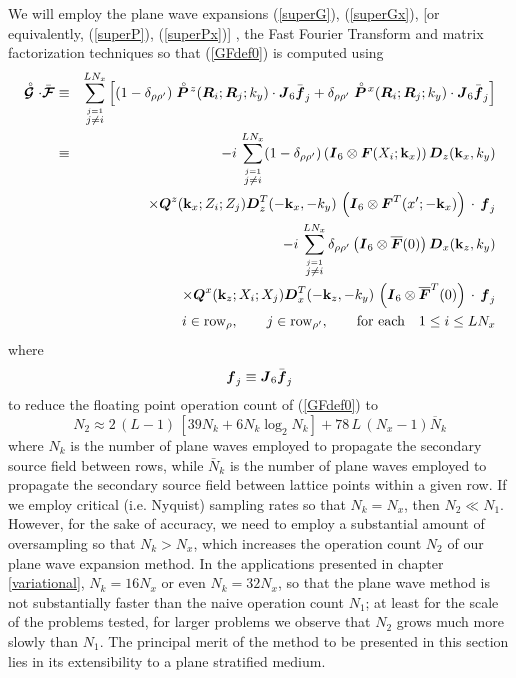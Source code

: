 We will employ the plane wave expansions (\ref{superG}), (\ref{superGx}),
[or equivalently,  (\ref{superP}), (\ref{superPx})] , the  Fast Fourier 
Transform and 
matrix factorization techniques so that (\ref{GFdef0}) is computed using
\begin{eqnarray} \label{GFdef}
\stackrel{\scriptscriptstyle _{\,\,\circ}}{ \mbox{\boldmath$\cal G$\unboldmath}} \cdot \bar{\mbox{\boldmath$\cal F$\unboldmath}} &\equiv& \sum\limits_{ \stackrel{j= 1}{j\not= i}}^{ 
L{N}_{x}} \left[
(1-\delta_{\rho \rho^{\prime}})
\stackrel{\scriptscriptstyle _{\,\,\circ}}{ \mbox{\boldmath$\mit P$\unboldmath}}\!{}^{z}({\mbox{\boldmath$\mit R$\unboldmath}}_{i};{\mbox{\boldmath$\mit R$\unboldmath}}_{j};{k}_{y}) \cdot {\mbox{\boldmath$\mit J$\unboldmath}}_6 \bar{\mbox{\boldmath$\mit f$\unboldmath}}_{ j}
+
\delta_{\rho \rho^{\prime}}\stackrel{\scriptscriptstyle _{\,\,\circ}}{ \mbox{\boldmath$\mit P$\unboldmath}}\!{}^{x}({\mbox{\boldmath$\mit R$\unboldmath}}_{i};{\mbox{\boldmath$\mit R$\unboldmath}}_{j};{k}_{y}) 
 \cdot {\mbox{\boldmath$\mit J$\unboldmath}}_6 \bar{\mbox{\boldmath$\mit f$\unboldmath}}_{ j}\right]\nonumber\\
&\equiv&- i\,\sum\limits_{ \stackrel{j= 1}{j\not= i}}^{ L{N}_{x}}
(1-\delta_{\rho \rho^{\prime}})\left({\mbox{\boldmath$\mit I$\unboldmath}}_6\otimes 
{\mbox{\boldmath$\mit F$\unboldmath}}(X_i;{\bf k}_{x})  \right) {\mbox{\boldmath$\mit D$\unboldmath}}_{z}({\bf k}_{x},{k}_{y})\nonumber\\
&& \times 
{\mbox{\boldmath$\mit Q$\unboldmath}}^{z}({\bf k}_{x};Z_i;Z_j){\mbox{\boldmath$\mit D$\unboldmath}}_{z}^{T}(-{\bf k}_{x},-{k}_{y})
\,\left({\mbox{\boldmath$\mit I$\unboldmath}}_6\otimes {\mbox{\boldmath$\mit F$\unboldmath}}^{T}(x^{\prime};-{\bf k}_{x})  \right)
\,\cdot\,{\mbox{\boldmath$\mit f$\unboldmath}}_{ j}\nonumber\\
&&- i\, \sum\limits_{ \stackrel{j= 1}{j\not= i}}^{ L{N}_{x}}
\delta_{\rho \rho^{\prime}}
\left({\mbox{\boldmath$\mit I$\unboldmath}}_6\otimes \overline{\mbox{\boldmath$\mit F$\unboldmath}}(0)  \right)
 {\mbox{\boldmath$\mit D$\unboldmath}}_{x}({\bf k}_{z},{k}_{y})\nonumber\\
&&\times
 {\mbox{\boldmath$\mit Q$\unboldmath}}^{x}({\bf k}_{z};X_i;X_j){\mbox{\boldmath$\mit D$\unboldmath}}_{x}^{T}(-{\bf k}_{z},-{k}_{y})
\,\left({\mbox{\boldmath$\mit I$\unboldmath}}_6\otimes \overline{\mbox{\boldmath$\mit F$\unboldmath}}^{T}(0)  \right)\,\cdot\,{\mbox{\boldmath$\mit f$\unboldmath}}_{ j}\nonumber\\
&&\qquad i\in \mbox{row}_{\rho}, \qquad j\in \mbox{row}_{\rho^{\prime}}, \qquad 
\mbox{for}\ \mbox{each} \quad  1\le  i \le L{N}_{x}
\end{eqnarray} 
where
\[
{\mbox{\boldmath$\mit f$\unboldmath}}_{ j}\equiv {\mbox{\boldmath$\mit J$\unboldmath}}_6 \bar{\mbox{\boldmath$\mit f$\unboldmath}}_{ j}
\]
to reduce the  floating point operation count of (\ref{GFdef0}) to
\[
N_2\approx2\,(L-1)\,\left[ 39 N_k + 6 N_k \log_2 N_k \right]+ 
78\,L\,(N_x-1)  \overline{N}_k
\]
where $N_k$ is the number of plane waves employed to propagate the 
secondary source field between rows, while $\bar{N}_k$ is the number of plane
 waves employed to propagate the 
secondary source field between lattice points within a given row.
If we employ critical (i.e. Nyquist) sampling rates so that $N_k=N_x$, then $N_2 \ll N_1$. 
However, for the sake of accuracy, we need to employ a substantial amount 
of oversampling so that $N_k>N_x$, which increases the operation count 
$N_2$ of our plane wave expansion method. In the applications presented 
in chapter \ref{variational}, $N_k=16 N_x$ or even $N_k=32 N_x$, so that the plane 
wave method is not substantially faster than the naive operation count 
$N_1$; at least for the scale of the problems tested, for larger problems 
we observe that $N_2$ grows much more slowly than $N_1$. The principal merit of the method to 
be presented in this section lies in its 
extensibility to a plane stratified  medium.

